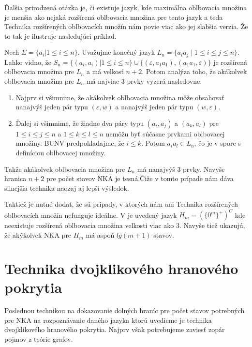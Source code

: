 Ďalšia prirodzená otázka je, či existuje jazyk, kde maximálna oblbovacia množina je menšia ako nejaká rozšírená oblbovacia množina pre tento jazyk a teda Technika rozšírených oblbovacích množín nám povie viac ako jej slabšia verzia. Že to tak je ilustruje nasledujúci príklad.

\begin{example}
Nech $ \Sigma = \lbrace a_i | 1 \leq i \leq n \rbrace $. Uvažujme konečný jazyk $ L_n = \lbrace a_i a_j \; | \; 1 \leq i \leq j \leq n \rbrace $. Lahko vidno, že $ S_n = \lbrace (a_i ,a_i) | 1 \leq i \leq n \rbrace \cup \lbrace (\varepsilon,a_1 a_1),(a_1 a_1, \varepsilon) \rbrace$ je rozšírená oblbovacia množina pre $ L_n $ a má velkosť $ n+2 $. Potom analýza toho, že akákolvek oblbovacia množina pre $ L_n $ má najviac 3 prvky vyzerá nasledovne:
\begin{enumerate}[label=(\alph*)]
\item Najprv si všimnime, že akákolvek oblbovacia množina môže obsahovať nanajvýš jeden pár typu $ (\varepsilon,w) $ a nanajvýš jeden pár typu $ (w,\varepsilon) $.
\item Ďalej si všimnime, že žiadne dva páry typu $ (a_i, a_j) $ a $ (a_k, a_l) $ pre $ 1 \leq i \leq j \leq n $ a $ 1 \leq k \leq l \leq n $ nemôžu byť súčasne prvkami oblbovacej množiny. BUNV predpokladajme, že $ i \leq k $. Potom $ a_i a_l \in L_n$, čo je v spore s definíciou oblbovacej množiny.
\end{enumerate}

Takže akákolvek oblbovacia množina pre $ L_n $ má nanajvýš 3 prvky. Navyše hranica $ n+2 $ pre počet stavov NKA je tesná.Čiže v tomto prípade nám dáva silnejšia technika naozaj aj lepší výsledok. 
\end{example}

Taktiež je nutné dodať, že sú prípady, v ktorých nám ani Technika rozšírených oblbovacích množín nefunguje ideálne. V \cite{GlaisterShalit1996} je uvedený jazyk $ H_m = (\lbrace 0^{m} \rbrace^+)^C $ kde neexistuje rozšírená oblbovacia množina velkosti viac ako 3. Navyše tiež ukazujú, že akýkolvek NKA pre $ H_m $ má aspoň $ lg(m+1) $ stavov.
 
\section{Technika dvojklikového hranového pokrytia}
Poslednou technikou na dokazovanie dolných hraníc pre počet stavov potrebných pre NKA na rozpoznávanie daného jazyka ktorú uvedieme je technika dvojklikového hranového pokrytia. Najprv však potrebujeme zaviesť zopár pojmov z teórie grafov.

